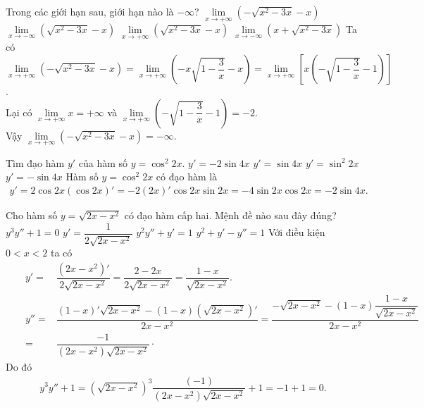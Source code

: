 \begin{ex}%
 Trong các giới hạn sau, giới hạn nào là $-\infty$?
 \choice
  {\True $\lim\limits_{x\to +\infty}\left(-\sqrt{x^2-3x}-x\right)$}
  {$\lim\limits_{x\to -\infty}\left(\sqrt{x^2-3x}-x\right)$}
  {$\lim\limits_{x\to +\infty}\left(\sqrt{x^2-3x}-x\right)$}
  {$\lim\limits_{x\to -\infty}\left(x+\sqrt{x^2-3x}\right)$}
 \loigiai
  {
  Ta có $\lim\limits_{x\to +\infty}\left(-\sqrt{x^2-3x}-x\right) = \lim\limits_{x \to +\infty}\left(-x\sqrt{1 - \dfrac{3}{x}}-x \right) = \lim\limits_{x \to +\infty}\left[x\left(-\sqrt{1 - \dfrac{3}{x}} - 1\right) \right]$.\\
  Lại có $\lim\limits_{x \to +\infty}x = +\infty$ và $\lim\limits_{x \to +\infty}\left(-\sqrt{1 - \dfrac{3}{x}} - 1\right) = -2$.\\
  Vậy $\lim\limits_{x\to +\infty}\left(-\sqrt{x^2-3x}-x\right) = -\infty$.
  }
\end{ex}


\begin{ex}%
 Tìm đạo hàm $y'$ của hàm số $y=\cos^2 2x$.
 \choice
  {\True $y' = -2\sin 4x$}
  {$y' = \sin4x$}
  {$y' = \sin^2 2x$}
  {$y' = -\sin4x$}
 \loigiai
  {
  Hàm số $y = \cos^2 2x$ có đạo hàm là
  \begin{align*}
   y' = 2\cos2x(\cos2x)' = -2(2x)'\cos2x\sin2x = -4\sin2x\cos2x=-2\sin4x.
  \end{align*}
  }
\end{ex}


\begin{ex}%
 Cho hàm số $y = \sqrt{2x - x^2}$ có đạo hàm cấp hai. Mệnh đề nào sau đây đúng?
 \choice
  {\True $y^3y''+1=0$}
  {$y'=\dfrac{1}{2\sqrt{2x-x^2}}$}
  {$y^2y''+y'=1$}
  {$y^2+y'-y''=1$}
 \loigiai
  {
  Với điều kiện $0<x<2$ ta có
  \begin{align*}
   &&y'=& \dfrac{(2x-x^2)'}{2\sqrt{2x-x^2}} = \dfrac{2-2x}{2\sqrt{2x-x^2}} = \dfrac{1-x}{\sqrt{2x-x^2}}.\\
   &&y''=& \dfrac{(1-x)'\sqrt{2x-x^2} - (1-x)\left(\sqrt{2x-x^2}\right)'}{2x-x^2}=\dfrac{-\sqrt{2x-x^2}-(1-x)\dfrac{1-x}{\sqrt{2x-x^2}}}{2x-x^2}\\
   &&=& \dfrac{-1}{(2x-x^2)\sqrt{2x-x^2}}\cdot
  \end{align*}
  Do đó
  \begin{align*}
   y^3y''+1 = \left(\sqrt{2x-x^2}\right)^3\dfrac{(-1)}{(2x-x^2)\sqrt{2x-x^2}}+1 = -1 + 1 = 0.
  \end{align*}
  }
\end{ex}


